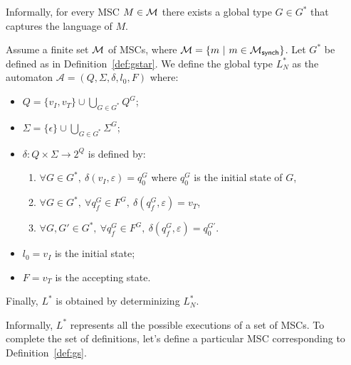 Informally, for every MSC $M\in\mathcal{M}$ there exists a global type $G\in G^*$ that
captures the language of $M$. 

\bigskip

\begin{definition}\label{def:lstar}
	Assume a finite set $\mathcal{M}$ of MSCs, where
	$\mathcal{M} = \{m\ |\ m \in \mathcal{M}_{\mathsf{synch}}\}$. Let $G^*$
	be defined as in Definition~\ref{def:gstar}.
	We define the global type $L^*_{N}$ as the automaton
	$\mathcal A = (Q,\Sigma, \delta, l_0, F)$ where:
	\begin{itemize}
		\item $Q = \{v_I,v_T\}\cup \bigcup_{G\in G^*} Q^G$;
		\item $\Sigma = \{\epsilon\}\cup\bigcup_{G\in G^*} \Sigma^G$;
		\item $\delta: Q \times \Sigma \rightarrow 2^Q$ is defined by:
			      \begin{enumerate}
				       \item $\forall G \in G^*,\ \delta(v_I, \varepsilon) = q_0^G$ where $q_0^G$ is the initial state of $G$,
				       \item $\forall G \in G^*,\ \forall q_f^G \in F^G,\ \delta(q_f^G, \varepsilon) = v_T$,
				       \item $\forall G, G' \in G^*,\ \forall q_f^G \in F^G,\ \delta(q_f^G, \varepsilon) = q_0^{G'}$.
			      \end{enumerate}
		\item $l_0 = v_I$ is the initial state;
		\item $F = v_T$ is the accepting state.
	\end{itemize}
	Finally, $L^*$ is obtained by determinizing $L^*_{N}$.
\end{definition}

Informally, $L^*$ represents all the
possible executions of a set of MSCs. To complete the set of definitions,
let's define a particular MSC corresponding to Definition~\ref{def:gs}.

\bigskip

